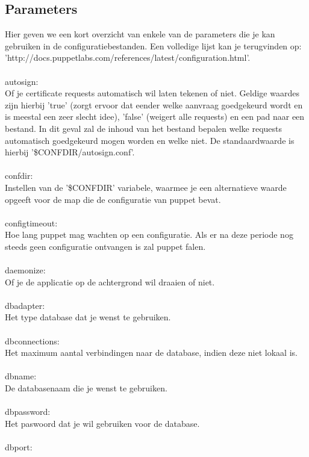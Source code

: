 \subsection{Parameters}
Hier geven we een kort overzicht van enkele van de parameters die je kan gebruiken in de configuratiebestanden. Een volledige lijst kan je terugvinden op: 'http://docs.puppetlabs.com/references/latest/configuration.html'.\\\\
%
autosign:\\
Of je certificate requests automatisch wil laten tekenen of niet. Geldige waardes zijn hierbij 'true' (zorgt ervoor dat eender welke aanvraag goedgekeurd wordt en is meestal een zeer slecht idee), 'false' (weigert alle requests) en een pad naar een bestand. In dit geval zal de inhoud van het bestand bepalen welke requests automatisch goedgekeurd mogen worden en welke niet. De standaardwaarde is hierbij '\$CONFDIR/autosign.conf'.\\\\
%
confdir:\\
Instellen van de '\$CONFDIR' variabele, waarmee je een alternatieve waarde opgeeft voor de map die de configuratie van puppet bevat.\\\\
%
configtimeout:\\
Hoe lang puppet mag wachten op een configuratie. Als er na deze periode nog steeds geen configuratie ontvangen is zal puppet falen.\\\\
%
daemonize:\\
Of je de applicatie op de achtergrond wil draaien of niet.\\\\
%
dbadapter:\\
Het type database dat je wenst te gebruiken.\\\\
%
dbconnections:\\
Het maximum aantal verbindingen naar de database, indien deze niet lokaal is.\\\\
%
dbname:\\
De databasenaam die je wenst te gebruiken.\\\\
%
dbpassword:\\
Het paswoord dat je wil gebruiken voor de database.\\\\
%
dbport:\\
